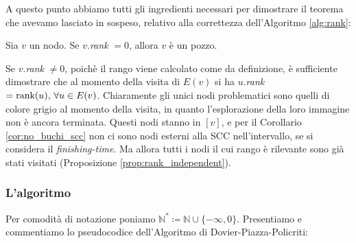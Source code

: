 A questo punto abbiamo tutti gli ingredienti necessari per dimostrare il teorema che avevamo lasciato in sospeso, relativo alla correttezza dell'Algoritmo \ref{alg:rank}:
\begin{proof2}
    Sia $v$ un nodo. Se $v$.\emph{rank} $= 0$, allora $v$ è un pozzo.

    Se $v$.\emph{rank} $\neq 0$, poichè il rango viene calcolato come da definizione, è sufficiente dimostrare che al momento della visita di $E(v)$ si ha $u$.\emph{rank} $= \textup{rank}(u), \,\forall u \in E(v)$. Chiaramente gli unici nodi problematici sono quelli di colore grigio al momento della visita, in quanto l'esplorazione della loro immagine non è ancora terminata. Questi nodi stanno in $[v]$, e per il Corollario \ref{cor:no_buchi_scc} non ci sono nodi esterni alla SCC nell'intervallo, se si considera il \emph{finishing-time}. Ma allora tutti i nodi il cui rango è rilevante sono già stati visitati (Proposizione \ref{prop:rank_independent}).
\end{proof2}

\subsubsection{L'algoritmo}
Per comodità di notazione poniamo $\mathbb{N}^* \coloneqq \mathbb{N} \cup \{-\infty, 0\}$. Presentiamo e commentiamo lo pseudocodice dell'Algoritmo di Dovier-Piazza-Policriti:

